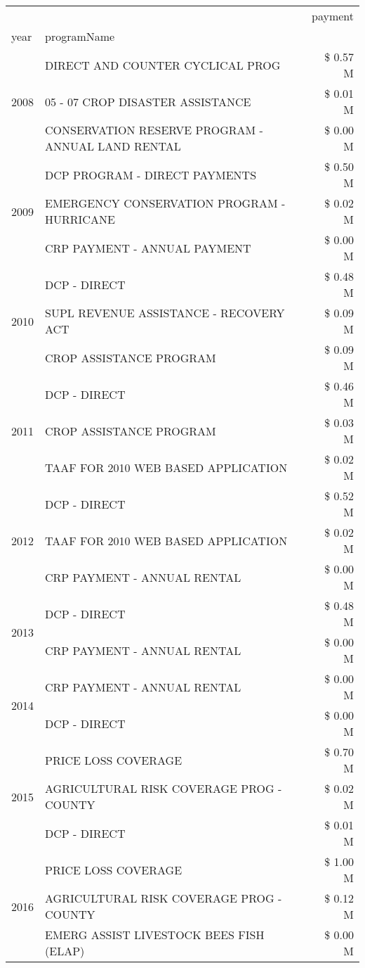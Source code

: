 \begin{tabular}{llr}
\toprule
 &  & payment \\
year & programName &  \\
\midrule
\multirow[t]{3}{*}{2008} & DIRECT AND COUNTER CYCLICAL PROG & \$ 0.57 M \\
 & 05 - 07 CROP DISASTER ASSISTANCE & \$ 0.01 M \\
 & CONSERVATION RESERVE PROGRAM - ANNUAL LAND RENTAL & \$ 0.00 M \\
\cline{1-3}
\multirow[t]{3}{*}{2009} & DCP PROGRAM - DIRECT PAYMENTS & \$ 0.50 M \\
 & EMERGENCY CONSERVATION PROGRAM - HURRICANE & \$ 0.02 M \\
 & CRP PAYMENT - ANNUAL PAYMENT & \$ 0.00 M \\
\cline{1-3}
\multirow[t]{3}{*}{2010} & DCP - DIRECT & \$ 0.48 M \\
 & SUPL REVENUE ASSISTANCE - RECOVERY ACT & \$ 0.09 M \\
 & CROP ASSISTANCE PROGRAM & \$ 0.09 M \\
\cline{1-3}
\multirow[t]{3}{*}{2011} & DCP - DIRECT & \$ 0.46 M \\
 & CROP ASSISTANCE PROGRAM & \$ 0.03 M \\
 & TAAF FOR 2010 WEB BASED APPLICATION & \$ 0.02 M \\
\cline{1-3}
\multirow[t]{3}{*}{2012} & DCP - DIRECT & \$ 0.52 M \\
 & TAAF FOR 2010 WEB BASED APPLICATION & \$ 0.02 M \\
 & CRP PAYMENT - ANNUAL RENTAL & \$ 0.00 M \\
\cline{1-3}
\multirow[t]{2}{*}{2013} & DCP - DIRECT & \$ 0.48 M \\
 & CRP PAYMENT - ANNUAL RENTAL & \$ 0.00 M \\
\cline{1-3}
\multirow[t]{2}{*}{2014} & CRP PAYMENT - ANNUAL RENTAL & \$ 0.00 M \\
 & DCP - DIRECT & \$ 0.00 M \\
\cline{1-3}
\multirow[t]{3}{*}{2015} & PRICE LOSS COVERAGE & \$ 0.70 M \\
 & AGRICULTURAL RISK COVERAGE PROG - COUNTY & \$ 0.02 M \\
 & DCP - DIRECT & \$ 0.01 M \\
\cline{1-3}
\multirow[t]{3}{*}{2016} & PRICE LOSS COVERAGE & \$ 1.00 M \\
 & AGRICULTURAL RISK COVERAGE PROG - COUNTY & \$ 0.12 M \\
 & EMERG ASSIST LIVESTOCK BEES FISH (ELAP) & \$ 0.00 M \\

\end{tabular}
